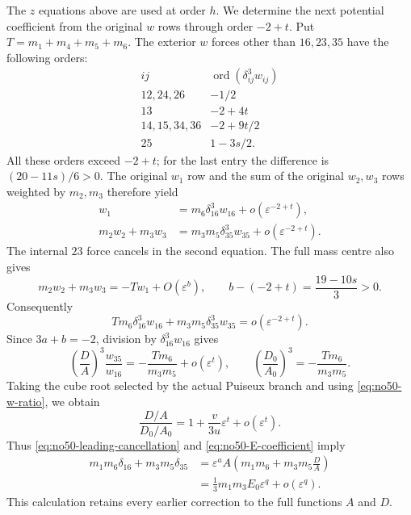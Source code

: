 \documentclass[11pt]{amsart}
\theoremstyle{remark}
\newcommand{\ord}{\operatorname{ord}}
\begin{document}
The $z$ equations above are used at order $h$. We determine
the next potential coefficient from the original $w$ rows
through order $-2+t$. Put
$T=m_1+m_4+m_5+m_6$. The exterior $w$ forces other than
$16,23,35$ have the following orders:
\[
 \begin{array}{c|c}
 ij&\ord(\delta_{ij}^3w_{ij})\\ \hline
 12,24,26&-1/2\\
 13&-2+4t\\
 14,15,34,36&-2+9t/2\\
 25&1-3s/2.
 \end{array}
\]
All these orders exceed $-2+t$; for the last entry the
difference is $(20-11s)/6>0$. The original $w_1$ row and
the sum of the original $w_2,w_3$ rows weighted by $m_2,m_3$
therefore yield
\[
 \begin{aligned}
 w_1&=m_6\delta_{16}^3w_{16}+o(\varepsilon^{-2+t}),\\
 m_2w_2+m_3w_3
 &=m_3m_5\delta_{35}^3w_{35}+o(\varepsilon^{-2+t}).
 \end{aligned}
\]
The internal $23$ force cancels in the second equation.
The full mass centre also gives
\[
 m_2w_2+m_3w_3=-Tw_1+O(\varepsilon^b),
 \qquad b-(-2+t)=\frac{19-10s}{3}>0.
\]
Consequently
\begin{equation}\label{eq:no50-full-w-relation}
 Tm_6\delta_{16}^3w_{16}
 +m_3m_5\delta_{35}^3w_{35}
 =o(\varepsilon^{-2+t}).
\end{equation}
Since $3a+b=-2$, division by $\delta_{16}^3w_{16}$ gives
\[
 \left(\frac DA\right)^3\frac{w_{35}}{w_{16}}
 =-\frac{Tm_6}{m_3m_5}+o(\varepsilon^t),\qquad
 \left(\frac{D_0}{A_0}\right)^3=-\frac{Tm_6}{m_3m_5}.
\]
Taking the cube root selected by the actual Puiseux branch
and using \eqref{eq:no50-w-ratio}, we obtain
\begin{equation}\label{eq:no50-phase-ratio}
 \frac{D/A}{D_0/A_0}
 =1+\frac{v}{3u}\varepsilon^t+o(\varepsilon^t).
\end{equation}
Thus \eqref{eq:no50-leading-cancellation} and
\eqref{eq:no50-E-coefficient} imply
\begin{align}
 m_1m_6\delta_{16}+m_3m_5\delta_{35}
 &=\varepsilon^a A\left(m_1m_6+m_3m_5\frac DA\right)\nonumber\\
 &=\frac13m_1m_3E_0\varepsilon^q+o(\varepsilon^q).
 \label{eq:no50-pair-potential}
\end{align}
This calculation retains every earlier correction to the full
functions $A$ and $D$.
\end{document}
